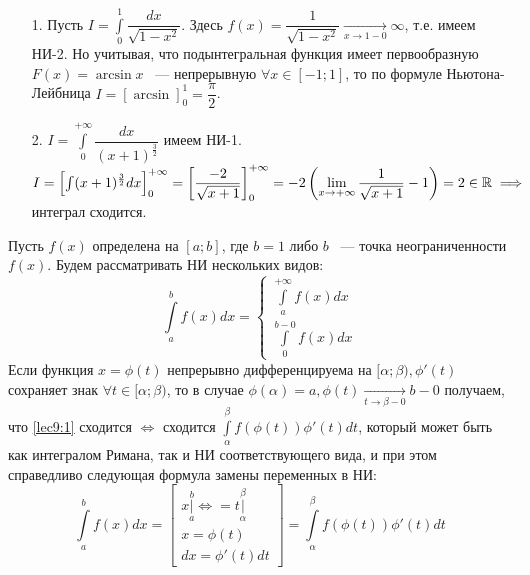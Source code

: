 \documentclass[../../main.tex]{subfiles}
\begin{document}
\begin{exmps}
\begin{enumerate}
	\item[1.] Пусть $ I = \int\limits_{0}^1 \dfrac{dx}{\sqrt{1 - x^2}} $.
	Здесь $ f(x) = \dfrac{1}{\sqrt{1 - x^2}} \underset{x \to 1 - 0}{\to}
	\infty $, т.е. имеем НИ-2. Но учитывая, что подынтегральная функция 
	имеет первообразную $ F(x) = \arcsin{x} $ ~--- непрерывную $ \forall x
	\in [-1; 1] $, то по формуле Ньютона-Лейбница $ 
	I = \left[\arcsin \right]_0^1 = \dfrac{\pi}{2} $.
	\item[2.] $ I = \int\limits_{0}^{+\infty} \dfrac{dx}{(x + 1)^{\frac{3}{2}}}$
	имеем НИ-1. $ I = \left[ \int (x + 1)^{\frac{3}{2}} dx\right]_0^{+\infty} 
	= \left[ \dfrac{-2}{\sqrt{x + 1}} \right]_0^{+\infty} = -2 \left(
	\lim\limits_{x \to + \infty} \dfrac{1}{\sqrt{x + 1}} - 1 \right) = 2
	\in \mathbb{R} \implies $ интеграл сходится.
\end{enumerate}
\end{exmps}
\begin{thm}
	Пусть $ f(x) $ определена на $ [a; b] $, где $ b = 1 $ либо $ b $ ~---
	точка неограниченности $ f(x) $. %
	Будем рассматривать НИ нескольких видов:
	\begin{equation}
		\label{lec9:1}
		\int\limits_a^b f(x) dx = 
		\begin{cases}
			\int\limits_a^{+\infty} f(x) dx\\
			\int\limits_{0}^{b - 0} f(x) dx
		\end{cases}
	\end{equation}
	Если функция $ x = \phi(t) $ непрерывно дифференцируема на $ [\alpha; \beta)
	, \phi'(t) $ сохраняет знак $ \forall t \in [\alpha; \beta) $, то
	в случае $ \phi(\alpha) = a, \phi(t) \underset{t \to \beta - 0}{\to} b - 0
	$ получаем, что \eqref{lec9:1} сходится $\iff$ сходится
	$ \int\limits_\alpha^\beta f(\phi(t)) \phi'(t) dt $, который может быть как
	интегралом Римана, так и НИ соответствующего вида, и при этом справедливо 
	следующая формула замены переменных в НИ:
	\begin{equation}
		\label{lec9:2}
		\int\limits_a^b f(x) dx = 
		\begin{bmatrix}
			x|\limits_a^b \iff= t|\limits_\alpha^\beta\\
			x = \phi(t)\\
			dx = \phi'(t)dt
		\end{bmatrix} =
		\int\limits_\alpha^\beta f(\phi(t)) \phi'(t) dt
	\end{equation}
\end{thm}
\end{document}
